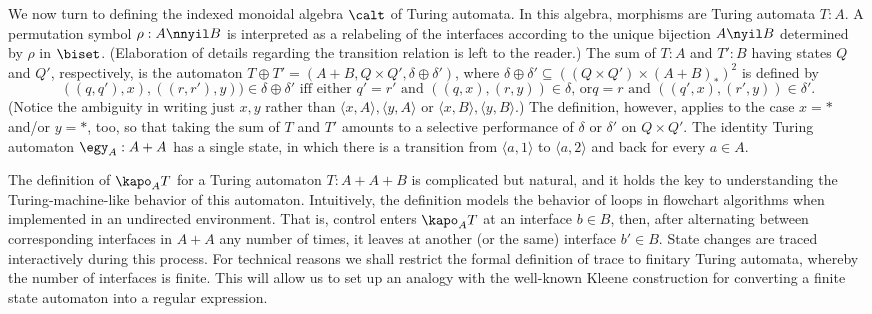 \documentclass{eptcs}
\begin{document}
  We now turn to defining the indexed monoidal algebra $\calt $ of Turing automata.
In this algebra, morphisms are Turing automata
$T:A$. A permutation symbol $\rho: A\nnyil B$ is interpreted as a relabeling of the
interfaces according to the unique bijection $A\nyil B$ determined by $\rho $ in $\biset $.
(Elaboration of details regarding the transition relation is left to the reader.)
The sum of $T:A$ and $T':B$ having states $Q$ and $Q'$, respectively, is the automaton
$T\oplus T'=(A+B, Q\times Q',\delta \oplus \delta ')$, where $\delta \oplus \delta '
\subseteq ((Q\times Q')\times (A+B)_*)^2$ is defined by 
\[ \mbox{$((q,q'),x),((r,r'),y))\in
\delta \oplus \delta '$ iff either $q'=r'$ and $((q,x),(r,y))\in \delta $, or
$q=r$ and $((q',x),(r',y))\in \delta '$.}\]
 (Notice the ambiguity in writing just
$x,y$ rather than $\langle x,A\rangle ,\langle y,A\rangle $ or $\langle x,B\rangle ,
\langle y,B\rangle $.) The definition, however, applies to
the case $x=*$ and/or $y=*$, too, so that taking the sum of $T$ and $T'$ amounts to
a selective performance of $\delta $ or $\delta '$ on $Q\times Q'$. 
The identity Turing automaton $\egy _A:A+A$ has a single state, in which there is a
transition from $\langle a,1\rangle $ to $\langle a,2\rangle $ and back for every
$a\in A$.

The definition of $\kapo _A T$ for a Turing automaton $T:A+A+B$ is complicated but
natural, and it holds the key to understanding the Turing-machine-like behavior of
this automaton. Intuitively, the definition models the behavior of loops in
flowchart algorithms \cite{elg} when implemented in an undirected environment.
That is, control enters $\kapo _A T$ at an interface $b\in B$, then, after alternating
between corresponding interfaces in $A+A$ any number of times, it leaves at another
(or the same) interface $b'\in B$. State changes are traced interactively during
this process. For technical reasons we shall restrict the formal definition of
trace to finitary Turing automata, whereby the number of interfaces is finite. This
will allow us to set up an analogy with the well-known Kleene construction
for converting a finite state automaton into a regular expression. 
\end{document}
